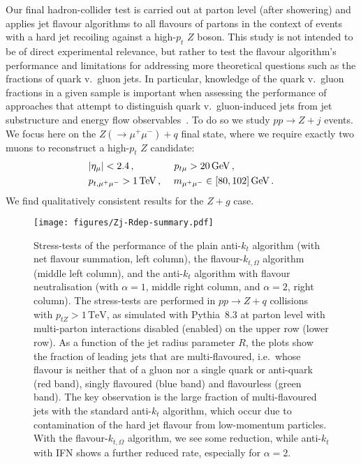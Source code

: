 \documentclass[nofootinbib,twocolumn,preprintnumbers,superscriptaddress,aps]{revtex4-2}
\newcommand{\TeV}{\,\text{TeV}}
\begin{document}
Our final hadron-collider test is carried out at parton level (after showering) and
applies jet flavour algorithms to all flavours of partons in the
context of events with a hard jet recoiling against a high-$p_t$ $Z$
boson. 
%
This study is not intended to be of direct experimental relevance, but
rather to test the flavour algorithm's performance and limitations for
addressing more theoretical questions such as the fractions of quark
v.\ gluon jets.
%
In particular, knowledge of the quark v.\ gluon fractions in a given
sample is important when assessing the performance of approaches that
attempt to distinguish quark v.\ gluon-induced jets from jet
substructure and energy flow observables~\cite{Gras:2017jty}.
%
To do so we study  $pp \to Z+j$ events.
%
We focus here on the $Z(\to \mu^+\mu^-)+q$ final state, where we
require exactly two muons to reconstruct a high-$p_t$ $Z$ candidate:
%
\begin{subequations}
  \begin{align}
&|\eta_{\mu}| < 2.4\,,\qquad\qquad p_{t\mu} > 20 {\,\rm GeV}\,,\\
&p_{t,\mu^+\mu^-} > 1 {\,\rm TeV}\,,\,\quad m_{\mu^+\mu^-} \in [80,102] {\,\rm GeV}\,.
\end{align}
\end{subequations}
%
We find qualitatively consistent results for the $Z+g$ case.

\begin{figure*}
  \centering
  \texttt{[image: figures/Zj-Rdep-summary.pdf]}
  \caption{
    Stress-tests of the performance of the plain anti-$k_t$ algorithm (with
    net flavour summation, left column), the flavour-$k_{t,\Omega}$ algorithm
    (middle left column), and the anti-$k_t$ algorithm with flavour 
    neutralisation (with $\alpha=1$, middle right column, and $\alpha=2$, right column).
    The
    stress-tests are performed in $pp \to Z+q$ collisions with $p_{tZ}>1 \TeV$,
    as simulated with Pythia~8.3 at parton level with multi-parton interactions
    disabled (enabled) on the upper row (lower row).
    As a function of the jet radius parameter $R$, the plots show the
    fraction of leading jets that are 
    multi-flavoured, i.e.\ whose flavour is neither that of a gluon
    nor a single quark or anti-quark (red band), singly flavoured
    (blue band) and flavourless (green band).
    The key observation is the large fraction of multi-flavoured jets
    with the standard anti-$k_t$ algorithm, which occur due to
    contamination of the hard jet flavour from low-momentum
    particles.
    With the flavour-$k_{t,\Omega}$ algorithm, we see some reduction, while
    anti-$k_t$ with IFN shows a further reduced rate, especially for
    $\alpha=2$.
  }
  \label{fig:Zj-tests}
\end{figure*}
\end{document}
